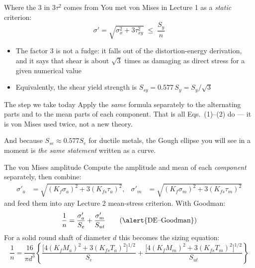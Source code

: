 \documentclass[aspectratio=169,10pt]{beamer}
\begin{document}
\begin{frame}{Where the 3 in $3\tau^{2}$ comes from}
You met von Mises in Lecture 1 as a \emph{static} criterion:
\[
\sigma'=\sqrt{\sigma_x^{2}+3\tau_{xy}^{2}}\;\le\;\frac{S_y}{n}
\]
\begin{itemize}
  \item The factor 3 is not a fudge: it falls out of the distortion-energy derivation, and it says that \alert{shear is about $\sqrt3$ times as damaging as direct stress} for a given numerical value
  \item Equivalently, the shear yield strength is $S_{sy}=0.577\,S_y=S_y/\sqrt3$
\end{itemize}
\vspace{2pt}
\begin{block}{The step we take today}
Apply the \emph{same} formula separately to the alternating parts and to the mean parts of each component. That is all Eqs.\ (1)--(2) do --- it is von Mises used twice, not a new theory.
\end{block}
\vspace{2pt}
\footnotesize And because $S_{se}\approx0.577S_e$ for ductile metals, the Gough ellipse you will see in a moment is \emph{the same statement} written as a curve.
\end{frame}

\begin{frame}{The von Mises amplitude}
Compute the amplitude and mean of each \emph{component} separately, then combine:
\begin{align*}
\sigma'_a&=\sqrt{(K_f\sigma_a)^2+3(K_{fs}\tau_a)^2}, &
\sigma'_m&=\sqrt{(K_f\sigma_m)^2+3(K_{fs}\tau_m)^2}
\end{align*}
and feed them into any Lecture 2 mean-stress criterion. With Goodman:
\[
\frac{1}{n}=\frac{\sigma'_a}{S_e}+\frac{\sigma'_m}{S_{ut}}
\qquad\text{(\alert{DE--Goodman})}
\]
For a solid round shaft of diameter $d$ this becomes the sizing equation:
\[
\frac{1}{n}=\frac{16}{\pi d^{3}}\left\{
\frac{\big[4(K_fM_a)^{2}+3(K_{fs}T_a)^{2}\big]^{1/2}}{S_e}
+\frac{\big[4(K_fM_m)^{2}+3(K_{fs}T_m)^{2}\big]^{1/2}}{S_{ut}}\right\}
\]
\end{frame}
\end{document}
